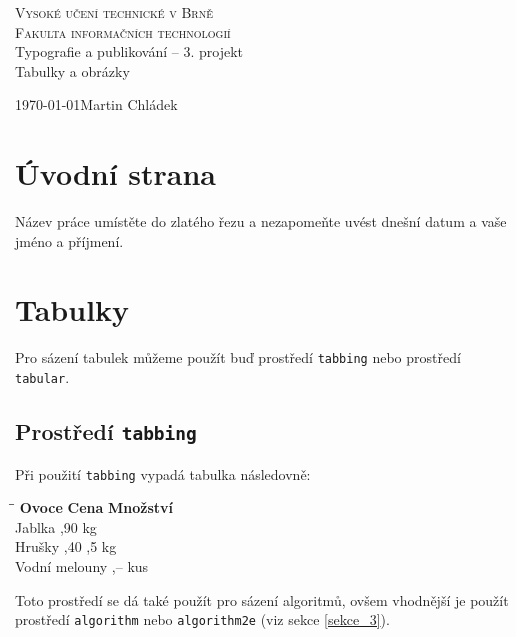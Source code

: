 \documentclass[11pt, a4paper]{article}
\author{Martin Chládek}
\date{6.3.2018}
\begin{document}
\begin{titlepage}
\begin{center}
    
\textsc{\Huge Vysoké učení technické v Brně\\[0.4em]
\huge Fakulta informačních technologií} \\
{\LARGE{Typografie a publikování -- 3. projekt}\\[0.3em] \Huge{Tabulky a obrázky}}\\ 
\end{center}
{\Large \today \hfill Martin Chládek}

\end{titlepage}

\newpage
\section{Úvodní strana}
Název práce umístěte do zlatého řezu a nezapomeňte uvést dnešní datum a vaše jméno a příjmení.

\section{Tabulky}

Pro sázení tabulek můžeme použít buď prostředí \verb|tabbing| nebo prostředí \verb|tabular|.

\subsection{Prostředí \texttt{tabbing}}
Při použití \verb|tabbing| vypadá tabulka následovně:

\begin{tabbing}
\hspace*{3cm}\=\hspace*{1,5cm}\= \kill
\textbf{Ovoce} \> \textbf{Cena} \> \textbf{Množství}\\
Jablka ,90  kg\\
Hrušky ,40 ,5 kg\\
Vodní melouny ,--  kus 
\end{tabbing}

\noindent
Toto prostředí se dá také použít pro sázení algoritmů, ovšem vhodnější je použít prostředí \verb|algorithm| nebo \verb|algorithm2e| (viz sekce \ref{sekce_3}).
\end{document}
